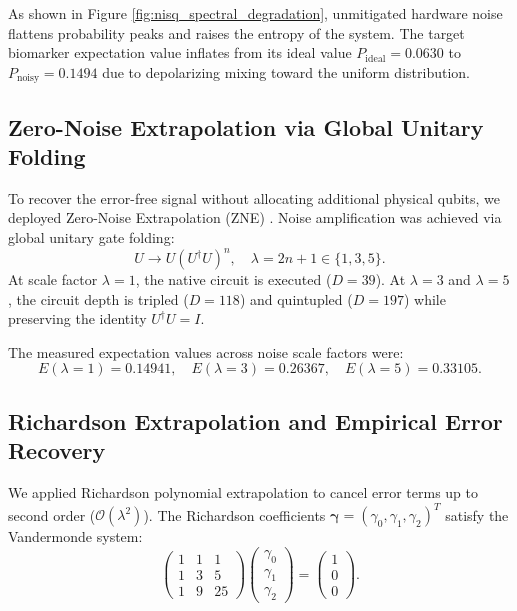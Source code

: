 As shown in Figure \ref{fig:nisq_spectral_degradation}, unmitigated hardware noise flattens probability peaks and raises the entropy of the system. The target biomarker expectation value inflates from its ideal value $P_{\mathrm{ideal}} = 0.0630$ to $P_{\mathrm{noisy}} = 0.1494$ due to depolarizing mixing toward the uniform distribution.

\subsection{Zero-Noise Extrapolation via Global Unitary Folding}
To recover the error-free signal without allocating additional physical qubits, we deployed Zero-Noise Extrapolation (ZNE) \cite{temme2017, li2017, endo2018}. Noise amplification was achieved via global unitary gate folding:
\begin{equation}
U \longrightarrow U \left( U^\dagger U \right)^n, \quad \lambda = 2n + 1 \in \{1, 3, 5\}.
\label{eq:zne_folding_rule_ch4}
\end{equation}
At scale factor $\lambda = 1$, the native circuit is executed ($D = 39$). At $\lambda = 3$ and $\lambda = 5$, the circuit depth is tripled ($D = 118$) and quintupled ($D = 197$) while preserving the identity $U^\dagger U = I$.

The measured expectation values across noise scale factors were:
\begin{equation}
E(\lambda=1) = 0.14941, \quad E(\lambda=3) = 0.26367, \quad E(\lambda=5) = 0.33105.
\label{eq:noisy_expectations_measured}
\end{equation}

\subsection{Richardson Extrapolation and Empirical Error Recovery}
We applied Richardson polynomial extrapolation to cancel error terms up to second order ($\mathcal{O}(\lambda^2)$). The Richardson coefficients $\boldsymbol{\gamma} = (\gamma_0, \gamma_1, \gamma_2)^T$ satisfy the Vandermonde system:
\begin{equation}
\begin{pmatrix} 1 & 1 & 1 \\ 1 & 3 & 5 \\ 1 & 9 & 25 \end{pmatrix} \begin{pmatrix} \gamma_0 \\ \gamma_1 \\ \gamma_2 \end{pmatrix} = \begin{pmatrix} 1 \\ 0 \\ 0 \end{pmatrix}.
\label{eq:vandermonde_richardson_system}
\end{equation}

